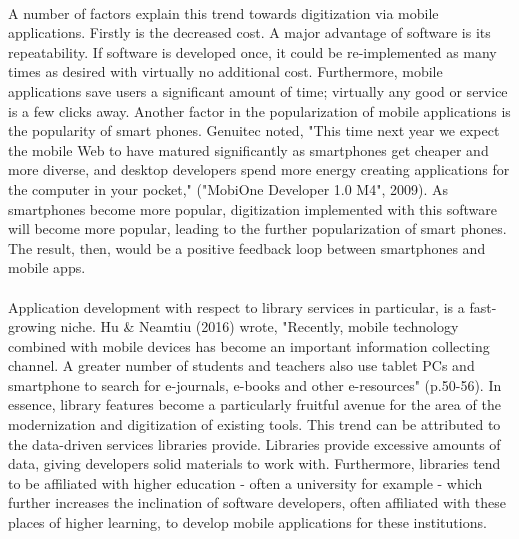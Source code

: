     \paragraph{}
     A number of factors explain this trend towards digitization via mobile applications. Firstly is the decreased cost. A major advantage of software is its repeatability. If software is developed once, it could be re-implemented as many times as desired with virtually no additional cost. Furthermore, mobile applications save users a significant amount of time; virtually any good or service is a few clicks away. Another factor in the popularization of mobile applications is the popularity of smart phones. Genuitec noted, "This time next year we expect the mobile Web to have matured significantly as smartphones get cheaper and more diverse, and desktop developers spend more energy creating applications for the computer in your pocket," ("MobiOne Developer 1.0 M4", 2009). As smartphones become more popular, digitization implemented with this software will become more popular, leading to the further popularization of smart phones. The result, then, would be a positive feedback loop between smartphones and mobile apps. 
     
     \paragraph{}
     Application development with respect to library services in particular, is a fast-growing niche. Hu & Neamtiu (2016) wrote, "Recently, mobile technology combined with mobile devices has become an important information collecting channel. A greater number of students and teachers also use tablet PCs and smartphone to search for e-journals, e-books and other e-resources" (p.50-56).
     In essence, library features become a particularly fruitful avenue for the area of the modernization and digitization of existing tools. This trend can be attributed to the data-driven services libraries provide. Libraries provide excessive amounts of data, giving developers solid materials to work with. Furthermore, libraries tend to be affiliated with higher education - often a university for example - which further increases the inclination of software developers, often affiliated with these places of higher learning, to develop mobile applications for these institutions.
